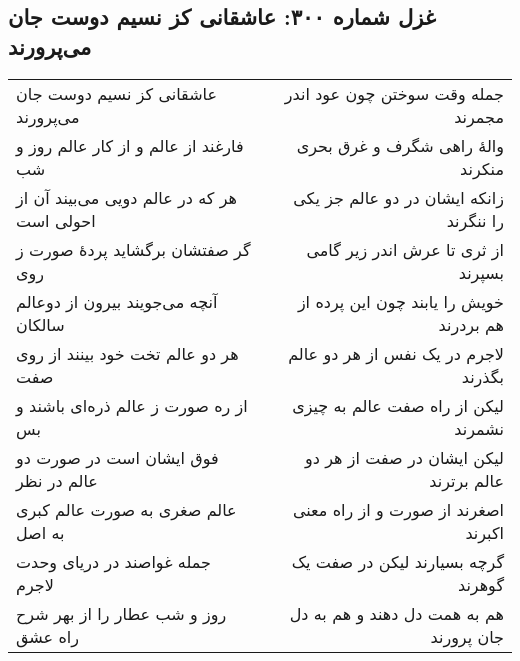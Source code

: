 \begin{center}
\section*{غزل شماره ۳۰۰: عاشقانی کز نسیم دوست جان می‌پرورند}
\label{sec:300}
\begin{longtable}{l p{0.5cm} r}
عاشقانی کز نسیم دوست جان می‌پرورند
&&
جمله وقت سوختن چون عود اندر مجمرند
\\
فارغند از عالم و از کار عالم روز و شب
&&
والهٔ راهی شگرف و غرق بحری منکرند
\\
هر که در عالم دویی می‌بیند آن از احولی است
&&
زانکه ایشان در دو عالم جز یکی را ننگرند
\\
گر صفتشان برگشاید پردهٔ صورت ز روی
&&
از ثری تا عرش اندر زیر گامی بسپرند
\\
آنچه می‌جویند بیرون از دوعالم سالکان
&&
خویش را یابند چون این پرده از هم بردرند
\\
هر دو عالم تخت خود بینند از روی صفت
&&
لاجرم در یک نفس از هر دو عالم بگذرند
\\
از ره صورت ز عالم ذره‌ای باشند و بس
&&
لیکن از راه صفت عالم به چیزی نشمرند
\\
فوق ایشان است در صورت دو عالم در نظر
&&
لیکن ایشان در صفت از هر دو عالم برترند
\\
عالم صغری به صورت عالم کبری به اصل
&&
اصغرند از صورت و از راه معنی اکبرند
\\
جمله غواصند در دریای وحدت لاجرم
&&
گرچه بسیارند لیکن در صفت یک گوهرند
\\
روز و شب عطار را از بهر شرح راه عشق
&&
هم به همت دل دهند و هم به دل جان پرورند
\\
\end{longtable}
\end{center}
